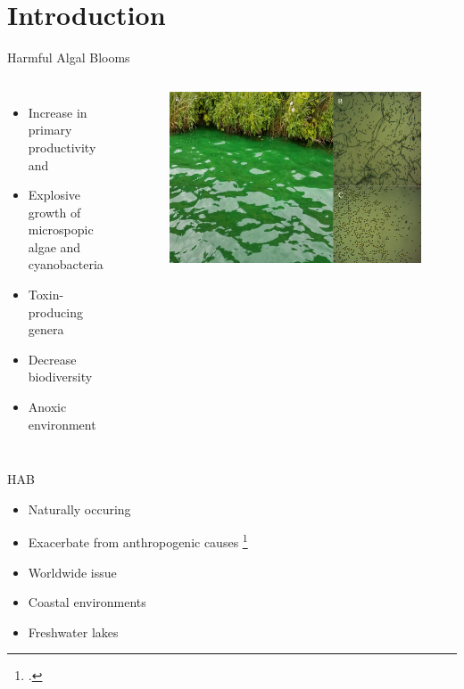 \section{Introduction}

\begin{frame}{Harmful Algal Blooms}

\begin{columns}

	\begin{itemize}
		\item Increase in primary productivity and 
		\item Explosive growth of microspopic algae and cyanobacteria
		\item Toxin-producing genera
		\item Decrease biodiversity
		\item Anoxic environment
	\end{itemize}

	\begin{figure}
		\hspace*{-12cm}
		\vspace*{-1cm}
		\includegraphics[scale=0.25]{../figures/cyano.png}
	\end{figure}
\end{columns}

\end{frame}
\begin{frame}{HAB}

	\begin{itemize}
		\item Naturally occuring
		\item Exacerbate from anthropogenic causes \footcite{rastogi_cyanotoxin-microcystins:_2014}
		\item Worldwide issue
		\item Coastal environments
		\item Freshwater lakes
	\end{itemize}

\end{frame}
